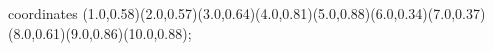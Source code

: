 					coordinates { (1.0,0.58)(2.0,0.57)(3.0,0.64)(4.0,0.81)(5.0,0.88)(6.0,0.34)(7.0,0.37)(8.0,0.61)(9.0,0.86)(10.0,0.88)};